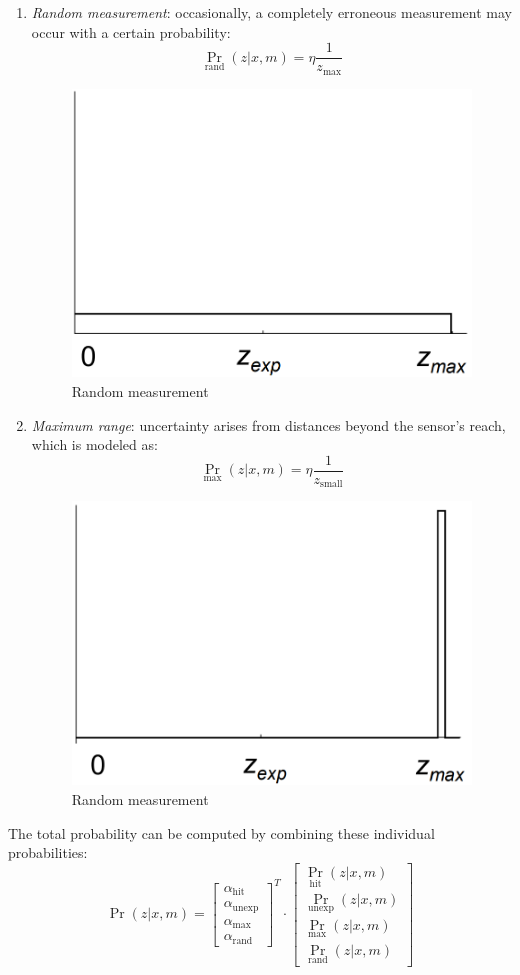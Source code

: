 \begin{enumerate}
\begin{figure}[H]
        \end{figure}
    \item \textit{Random measurement}: occasionally, a completely erroneous measurement may occur with a certain probability:
        \[\Pr_{\text{rand}}(z|x,m)=\eta\dfrac{1}{z_{\max}}\]
        \begin{figure}[H]
            \centering
            \includegraphics[width=0.4\linewidth]{images/rm.png}
            \caption{Random measurement}
        \end{figure}
    \item \textit{Maximum range}: uncertainty arises from distances beyond the sensor's reach, which is modeled as:
        \[\Pr_{\max}(z|x,m)=\eta \dfrac{1}{z_{\text{small}}}\]
        \begin{figure}[H]
            \centering
            \includegraphics[width=0.4\linewidth]{images/mr.png}
            \caption{Random measurement}
        \end{figure}
\end{enumerate}
The total probability can be computed by combining these individual probabilities:
\[\Pr(z|x,m)=\begin{bmatrix}
    \alpha_{\text{hit}} \\
    \alpha_{\text{unexp}} \\
    \alpha_{\text{max}} \\
    \alpha_{\text{rand}}
\end{bmatrix}^T \cdot \begin{bmatrix}
    \Pr_{\text{hit}}(z|x,m) \\
    \Pr_{\text{unexp}}(z|x,m) \\
    \Pr_{\text{max}}(z|x,m) \\
    \Pr_{\text{rand}}(z|x,m)
\end{bmatrix}\]
